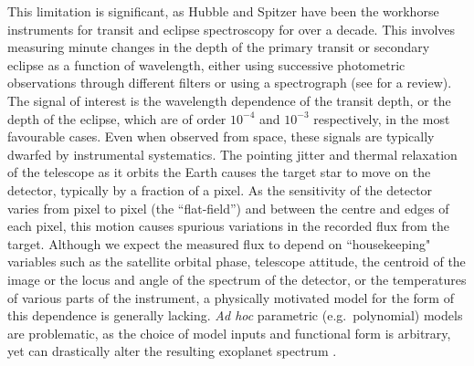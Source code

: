 \documentclass[letterpaper]{ar-1col}
\begin{document}
This limitation is significant, as Hubble and Spitzer have been the workhorse instruments for transit and eclipse spectroscopy for over a decade. This involves measuring minute changes in the depth of the primary transit or secondary eclipse as a function of wavelength, either using successive photometric observations through different filters or using a spectrograph (see \citealt {2018haex.bookE.100K} for a review). The signal of interest is the wavelength dependence of the transit depth, or the depth of the eclipse, which are of order $10^{-4}$ and $10^{-3}$ respectively, in  the most favourable cases. Even when observed from space, these signals are typically dwarfed by instrumental systematics. The pointing jitter and thermal relaxation of the telescope as it orbits the Earth causes the target star to move on the detector, typically by a fraction of a pixel. As the sensitivity of the detector varies from pixel to pixel (the ``flat-field'') and between the centre and edges of each pixel, this motion causes spurious variations in the recorded flux from the target. Although we expect the measured flux to depend on ``housekeeping" variables such as the satellite orbital phase, telescope attitude, the centroid of the image or the locus and angle of the spectrum of the detector, or the temperatures of various parts of the instrument, a physically motivated model for the form of this dependence is generally lacking. \textit{Ad hoc} parametric (e.g.\ polynomial) models are problematic, as the choice of model inputs and functional form is arbitrary, yet can drastically alter the resulting exoplanet spectrum \citep{2011MNRAS.411.2199G}.
\end{document}
